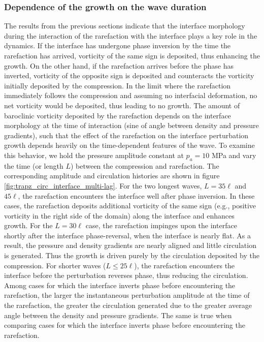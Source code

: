 \subsubsection{Dependence of the growth on the wave duration}%
\label{subsubsec:transient}


The results from the previous sections indicate that the interface
morphology during the interaction of the rarefaction with the
interface plays a key role in the dynamics.  If the interface has
undergone phase inversion by the time the rarefaction has arrived,
vorticity of the same sign is deposited, thus enhancing the growth.
On the other hand, if the rarefaction arrives before the phase has
inverted, vorticity of the opposite sign is deposited and counteracts
the vorticity initially deposited by the compression. In the limit
where the rarefaction immediately follows the compression and assuming
no interfacial deformation, no net vorticity would be deposited, thus
leading to no growth.  The amount of baroclinic vorticity deposited by
the rarefaction depends on the interface morphology at the time of
interaction (sine of angle between density and pressure gradients),
such that the effect of the rarefaction on the interface perturbation
growth depends heavily on the time-dependent features of the wave. To
examine this behavior, we hold the pressure amplitude constant at
$p_a = 10$ MPa and vary the time (or length $L$) between the
compression and rarefaction. The corresponding amplitude and
circulation histories are shown in figure
\ref{fig:trapz_circ_interface_multi-lag}.  For the two longest waves,
$L=35\ell$ and $45\ell$, the rarefaction encounters the interface well
after phase inversion. In these cases, the rarefaction deposits
additional vorticity of the same sign (e.g., positive vorticity in the
right side of the domain) along the interface and enhances growth. For
the $L=30\ell$ case, the rarefaction impinges upon the interface
shortly after the interface phase-reversal, when the interface is
nearly flat. As a result, the pressure and density gradients are
nearly aligned and little circulation is generated. Thus the growth is
driven purely by the circulation deposited by the compression. For
shorter waves ($L \leq 25\ell$), the rarefaction encounters the
interface before the perturbation reverses phase, thus reducing the
circulation.  Among cases for which the interface inverts phase before
encountering the rarefaction, the larger the instantaneous
perturbation amplitude at the time of the rarefaction, the greater the
circulation generated due to the greater average angle between the
density and pressure gradients. The same is true when comparing cases
for which the interface inverts phase before encountering the
rarefaction.

